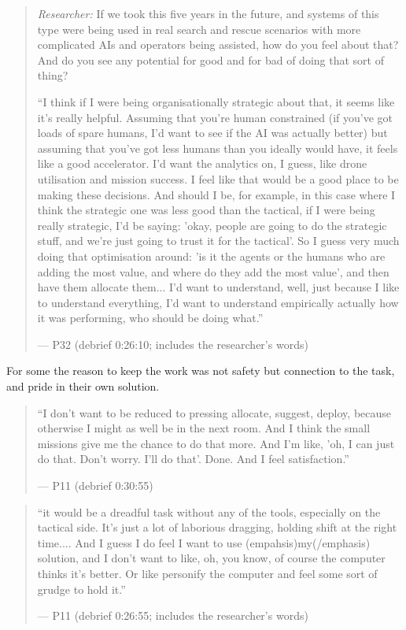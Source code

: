 \begin{quote}\small
{\footnotesize\textit{Researcher:} If we took this five years in the future, and systems of this type were being used in real search and rescue scenarios with more complicated AIs and operators being assisted, how do you feel about that? And do you see any potential for good and for bad of doing that sort of thing?}\par\smallskip
``I think if I were being organisationally strategic about that, it seems like it's really helpful. Assuming that you're human constrained (if you've got loads of spare humans, I'd want to see if the AI was actually better) but assuming that you've got less humans than you ideally would have, it feels like a good accelerator. I'd want the analytics on, I guess, like drone utilisation and mission success. I feel like that would be a good place to be making these decisions. And should I be, for example, in this case where I think the strategic one was less good than the tactical, if I were being really strategic, I'd be saying: 'okay, people are going to do the strategic stuff, and we're just going to trust it for the tactical'. So I guess very much doing that optimisation around: 'is it the agents or the humans who are adding the most value, and where do they add the most value', and then have them allocate them... I'd want to understand, well, just because I like to understand everything, I'd want to understand empirically actually how it was performing, who should be doing what.''\par\hfill--- P32 (debrief 0:26:10; includes the researcher's words)
\end{quote}


\label{sec:qual:who-decides:ownership}
For some the reason to keep the work was not safety but connection to the task, and pride in their own solution.

\begin{quote}\small
``I don't want to be reduced to pressing allocate, suggest, deploy, because otherwise I might as well be in the next room. And I think the small missions give me the chance to do that more. And I'm like, 'oh, I can just do that. Don't worry. I'll do that'. Done. And I feel satisfaction.''\par\hfill--- P11 (debrief 0:30:55)
\end{quote}

\begin{quote}\small
``it would be a dreadful task without any of the tools, especially on the tactical side. It's just a lot of laborious dragging, holding shift at the right time.... And I guess I do feel I want to use (empahsis)my(/emphasis) solution, and I don't want to like, oh, you know, of course the computer thinks it's better. Or like personify the computer and feel some sort of grudge to hold it.''\par\hfill--- P11 (debrief 0:26:55; includes the researcher's words)
\end{quote}

